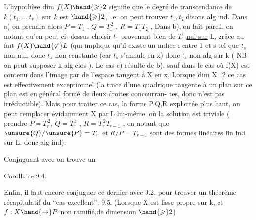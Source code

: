 
L'hypothèse  dim $f(X)\hand{\geqslant} 2$  signifie que  le degré de transcendance de
$k(t_1,..,t_r)$ sur $k$  est $\hand{\geqslant} 2$, i.e. on peut trouver  $t_1,t_2$ disons alg ind.
Dans a) on prendra alors   $P = T_1$ , $Q = T_1^{\,2}$ , $R = T_1T_2$ , Dans b), on
fait pareil,  en notant qu'on peut ci-%
dessus choisir $t_1$ provenant bien de $T_1$ \uline{nul sur} L, grâce au fait $f(X)\hand{\not\subset} L$
(qui implique qu'il  existe un indice  i  entre 1 et s tel que $t_s$ non
nul, donc $t_s$ non constante (car $t_s$ s'annule en x) donc $t_s$  non alg sur k
( NB on peut supposer k alg clos ).  Le cas c) résulte de b),  sauf dans le cas où  f(X) est contenu dans
l'image  par  de l'espace tangent à X en x,  \hand{[}Lorsque dim X=2
ce cas est effectivement exceptionnel (la trace d'une quadrique tangente
à un plan sur ce plan est en général formé de deux droites concourran-%
tes, donc n'est pas irréductible)\hand{]}. Mais pour traiter ce cas,  la
forme P,Q,R explicitée plus haut, on peut remplacer évidamment X par
L lui-même, où la solution est triviale (  prendre $P=T_r^{\,2}$, $Q=T_r^{\,3}$ ,
$R = T_r^{\,2}T_{r-1}$ , en notant que  $\unsure{Q}/\unsure{P} = T_r$ et  $R/P = T_{r-1}$ sont des formes
linéaires lin ind sur L, donc alg ind). 

Conjuguant avec  on trouve un

\uline{Corollaire} 9.4.   

Enfin, il faut encore conjuguer  ce dernier avec 9.2. pour
trouver un théorème récapitulatif  du ``cas excellent'':
 9.5.   (Lorsque X est lisse  propre sur k, et $f:X\hand{\to} P$ non
ramifié,de dimension $\hand{\geqslant} 2$)

